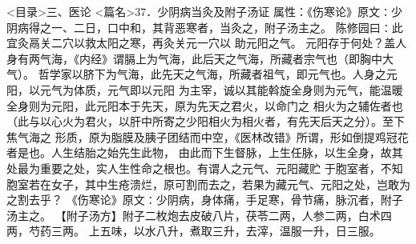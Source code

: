 \documentclass[a4paper,12pt,UTF8,twoside]{ctexbook}
\begin{document}
<目录>三、医论
<篇名>37．少阴病当灸及附子汤证
属性：《伤寒论》原文∶少阴病得之一、二日，口中和，其背恶寒者，当灸之，附子汤主之。 
陈修园曰∶此宜灸鬲关二穴以救太阳之寒，再灸关元一穴以 
助元阳之气。 
元阳存于何处？盖人身有两气海，《内经》谓膈上为气海，此后天之气海，所藏者宗气也（即胸中大气）。 
哲学家以脐下为气海，此先天之气海，所藏者祖气，即元气也。人身之元阳，以元气为体质，元气即以元阳 
为主宰，诚以其能斡旋全身则为元气，能温暖全身则为元阳，此元阳本于先天，原为先天之君火，以命门之 
相火为之辅佐者也（此与以心火为君火，以肝中所寄之少阳相火为相火者，有先天后天之分）。至下焦气海之 
形质，原为脂膜及胰子团结而中空，《医林改错》所谓，形如倒提鸡冠花者是也。人生结胎之始先生此物， 
由此而下生督脉，上生任脉，以生全身，故其处最为重要之处，实人生性命之根也。有谓人之元气、元阳藏贮 
于胞室者，不知胞室若在女子，其中生疮溃烂，原可割而去之，若果为藏元气、元阳之处，岂敢为之割去乎？ 
《伤寒论》原文∶少阴病，身体痛，手足寒，骨节痛，脉沉者，附子汤主之。 
【附子汤方】附子二枚炮去皮破八片，茯苓二两，人参二两，白术四两，芍药三两。 
上五味，以水八升，煮取三升，去滓，温服一升，日三服。 
\end{document}
